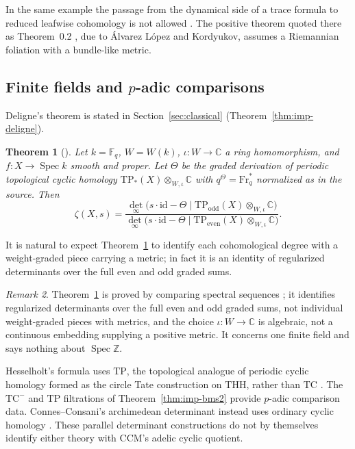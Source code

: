 \documentclass[11pt]{amsart}
\theoremstyle{plain}
\newtheorem{theorem}{Theorem}[section]
\theoremstyle{definition}
\theoremstyle{remark}
\newtheorem{remark}[theorem]{Remark}
\numberwithin{equation}{section}
\newcommand{\C}{\mathbb{C}}
\newcommand{\Z}{\mathbb{Z}}
\newcommand{\F}{\mathbb{F}}
\DeclareMathOperator{\Spec}{Spec}
\newcommand{\detreg}{{\det}_{\infty}}
\begin{document}
In the same example the passage from the dynamical side of a trace
formula to reduced leafwise cohomology is not allowed
\cite[\S2, pp.~215--217]{DeningerSinghof2001Counterexample}. The
positive theorem quoted there as Theorem~0.2 \cite[p.~210]%
{DeningerSinghof2001Counterexample}, due to \'Alvarez L\'opez and
Kordyukov, assumes a Riemannian foliation with a bundle-like metric.

\subsection{Finite fields and \texorpdfstring{$p$}{p}-adic comparisons}

Deligne's theorem is stated in Section~\ref{sec:classical}
(Theorem~\ref{thm:imp-deligne}).

\begin{theorem}[{\cite[Theorem~A, p.~2]{Hesselholt2016THHZeta}}]
\label{thm:imp-h17}
Let $k=\F_q$, $W=W(k)$, $\iota:W\to\C$ a ring homomorphism, and
$f:X\to\Spec k$ smooth and proper. Let $\Theta$ be the graded
derivation of periodic topological cyclic homology
$\mathrm{TP}_*(X)\otimes_{W,\iota}\C$ with $q^\Theta=\mathrm{Fr}_q^*$
normalized as in the source. Then
\[
\zeta(X,s)=\frac{\detreg\bigl(s\cdot\mathrm{id}-\Theta\mid
  \mathrm{TP}_{\mathrm{odd}}(X)\otimes_{W,\iota}\C\bigr)}
 {\detreg\bigl(s\cdot\mathrm{id}-\Theta\mid
  \mathrm{TP}_{\mathrm{even}}(X)\otimes_{W,\iota}\C\bigr)}.
\]
\end{theorem}

It is natural to expect Theorem~\ref{thm:imp-h17} to identify each
cohomological degree with a weight-graded piece carrying a metric; in
fact it is an identity of regularized determinants over the full even
and odd graded sums.

\begin{remark}\label{rem:N-h17}
Theorem~\ref{thm:imp-h17} is proved by comparing spectral sequences
\cite[pp.~2--3]{Hesselholt2016THHZeta}; it identifies regularized
determinants over the full even and odd graded sums, not individual
weight-graded pieces with metrics, and the choice $\iota:W\to\C$ is
algebraic, not a continuous embedding supplying a positive metric. It
concerns one finite field and says nothing about $\Spec\Z$.
\end{remark}

Hesselholt's formula uses $\mathrm{TP}$, the topological analogue
of periodic cyclic homology formed as the circle Tate construction
on $\mathrm{THH}$, rather than $\mathrm{TC}$
\cite[Theorem~A and p.~1]{Hesselholt2016THHZeta}. The
$\mathrm{TC}^-$ and $\mathrm{TP}$ filtrations of
Theorem~\ref{thm:imp-bms2} provide $p$-adic comparison data.
Connes--Consani's archimedean determinant instead uses ordinary
cyclic homology \cite[Theorem~1.1]{ConnesConsani2014CyclicSerre}.
These parallel determinant constructions do not by themselves
identify either theory with CCM's adelic cyclic quotient.
\end{document}

